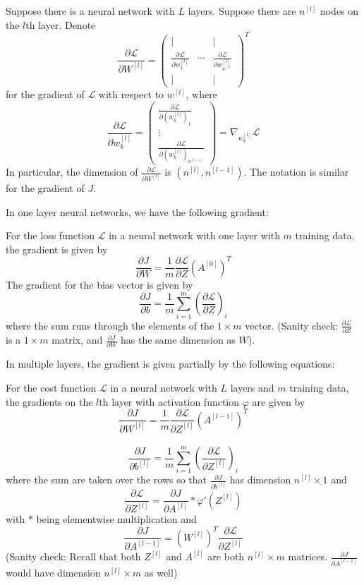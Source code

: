 \documentclass[a4paper]{article}
\begin{document}
\begin{enumerate}
\begin{defn}{}{} Suppose there is a neural network with $L$ layers. Suppose there are $n^{[l]}$ nodes on the $l$th layer. Denote $$\frac{\partial\mathcal{L}}{\partial W^{[l]}}=\begin{pmatrix}
| & & |\\
\frac{\partial\mathcal{L}}{\partial w_1^{[l]}} & \cdots & \frac{\partial\mathcal{L}}{\partial w_{n^{[l]}}^{[l]}}\\
| & & |
\end{pmatrix}^T$$ for the gradient of $\mathcal{L}$ with respect to $w^{[l]}$, where $$\frac{\partial\mathcal{L}}{\partial w_k^{[l]}}=\begin{pmatrix}
\frac{\partial\mathcal{L}}{\partial (w_k^{[l]})_1}\\
\vdots\\
\frac{\partial\mathcal{L}}{\partial (w_k^{[l]})_{n^{[l-1]}}}
\end{pmatrix}=\nabla_{w_k^{[l]}}\mathcal{L}$$
In particular, the dimension of $\frac{\partial\mathcal{L}}{\partial W^{[l]}}$ is $(n^{[l]},n^{[l-1]})$. The notation is similar for the gradient of $J$. 
\end{defn}

In one layer neural networks, we have the following gradient: 

\begin{prp}{}{} For the loss function $\mathcal{L}$ in a neural network with one layer with $m$ training data, the gradient is given by $$\frac{\partial J}{\partial W}=\frac{1}{m}\frac{\partial\mathcal{L}}{\partial Z}(A^{[0]})^T$$  The gradient for the bias vector is given by $$\frac{\partial J}{\partial b}=\frac{1}{m}\sum_{i=1}^m\left(\frac{\partial\mathcal{L}}{\partial Z}\right)_i$$ where the sum runs through the elements of the $1\times m$ vector. (Sanity check: $\frac{\partial\mathcal{L}}{\partial Z}$ is a $1\times m$ matrix, and $\frac{\partial J}{\partial W}$ has the same dimension as $W$).
\end{prp}

In multiple layers, the gradient is given partially by the following equations: 

\begin{prp}{}{} For the cost function $\mathcal{L}$ in a neural network with $L$ layers and $m$ training data, the gradients on the $l$th layer with activation function $\varphi$ are given by $$\frac{\partial J}{\partial W^{[l]}}=\frac{1}{m}\frac{\partial\mathcal{L}}{\partial Z^{[l]}}\left(A^{[l-1]}\right)^T$$~$$\frac{\partial J}{\partial b^{[l]}}=\frac{1}{m}\sum_{i=1}^m\left(\frac{\partial\mathcal{L}}{\partial Z^{[l]}}\right)_i$$ where the sum are taken over the rows so that $\frac{\partial J}{\partial b^{[l]}}$ has dimension $n^{[l]}\times 1$ and $$\frac{\partial\mathcal{L}}{\partial Z^{[l]}}=\frac{\partial J}{\partial A^{[l]}}\ast\varphi'(Z^{[l]})$$ with $\ast$ being elementwise multiplication and $$\frac{\partial J}{\partial A^{[l-1]}}=(W^{[l]})^T\frac{\partial\mathcal{L}}{\partial Z^{[l]}}$$ (Sanity check: Recall that both $Z^{[l]}$ and $A^{[l]}$ are both $n^{[l]}\times m$ matrices. $\frac{\partial J}{\partial A^{[l-1]}}$ would have dimension $n^{[l]}\times m$ as well)
\end{prp}


\end{enumerate}
\end{document}

